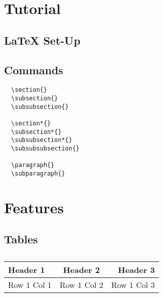 
\section{Tutorial}

\subsection{\LaTeX{} Set-Up}
\subsection{Commands}
\begin{verbatim}
  \section{}
  \subsection{}
  \subsubsection{}

  \section*{}
  \subsection*{}
  \subsubsection*{}
  \subsubsubsection{}

  \paragraph{}
  \subparagraph{}
\end{verbatim}

\section{Features}
\subsection{Tables}


\begin{table}[ht]
  \centering
  \begin{tabular} {|l|c|r|}
    \hline
    Header 1 & Header 2 & Header 3 \\
    \hline
    Row 1 Col 1 & Row 1 Col 2 & Row 1 Col 3 \\
    \hline
  \end{tabular}
  \caption{}
\end{table}

